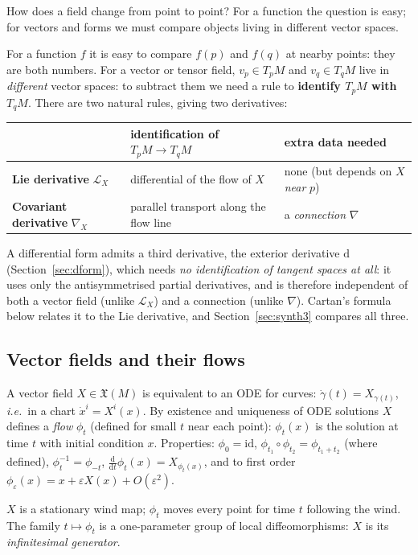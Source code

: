 \documentclass[11pt,a4paper]{article}
\numberwithin{equation}{section}
\theoremstyle{definition}
\theoremstyle{plain}
\newcommand{\dd}{\mathrm{d}}
\newcommand{\id}{\mathrm{id}}
\newcommand{\Lie}{\mathcal{L}}
\newcommand{\Xfield}{\mathfrak{X}}
\newcommand{\ie}{\emph{i.e.}\ }
\begin{document}
How does a field change from point to point? For a function the question is easy; for vectors and forms we must compare objects living in different
vector spaces.
\begin{intuition}
For a function $f$ it is easy to compare $f(p)$ and $f(q)$ at nearby points: they are both numbers. For a vector or tensor field, $v_p\in T_pM$ and $v_q\in T_qM$ live in \emph{different} vector spaces: to subtract them we need a rule to \textbf{identify $T_pM$ with $T_qM$}. There are two natural rules, giving two derivatives:
\begin{center}
\begin{tabular}{@{}p{3.6cm}p{5.6cm}p{5.2cm}@{}}
\toprule
 & identification of $T_pM\to T_{q}M$ & extra data needed\\ \midrule
\textbf{Lie derivative} $\Lie_X$ & differential of the flow of $X$ & none (but depends on $X$ \emph{near} $p$)\\
\textbf{Covariant derivative} $\nabla_X$ & parallel transport along the flow line & a \emph{connection} $\nabla$\\ \bottomrule
\end{tabular}
\end{center}
\end{intuition}


\begin{remark}
A differential form admits a third derivative, the exterior derivative $\dd$ (Section~\ref{sec:dform}), which needs \emph{no identification of tangent spaces at all}: it
uses only the antisymmetrised partial derivatives, and is therefore independent of both a vector field (unlike $\Lie_X$) and a connection (unlike $\nabla$).
Cartan's formula below relates it to the Lie derivative, and Section~\ref{sec:synth3} compares all three.
\end{remark}
\subsection{Vector fields and their flows}
\begin{formal}
A vector field $X\in\Xfield(M)$ is equivalent to an ODE for curves: $\dot\gamma(t)=X_{\gamma(t)}$, \ie in a chart $\dot x^i=X^i(x)$. By existence and uniqueness of ODE solutions $X$ defines a \emph{flow} $\phi_t$ (defined for small $t$ near each point): $\phi_t(x)$ is the solution at time $t$ with initial condition $x$. Properties: $\phi_0=\id$, $\phi_{t_1}\circ\phi_{t_2}=\phi_{t_1+t_2}$ (where defined), $\phi_t^{-1}=\phi_{-t}$, $\frac{\dd}{\dd t}\phi_t(x)=X_{\phi_t(x)}$, and to first order $\phi_\varepsilon(x)=x+\varepsilon X(x)+O(\varepsilon^2)$.
\end{formal}
\begin{intuition}
$X$ is a stationary wind map; $\phi_t$ moves every point for time $t$ following the wind. The family $t\mapsto\phi_t$ is a one-parameter group of local diffeomorphisms: $X$ is its \emph{infinitesimal generator}.
\end{intuition}
\end{document}
